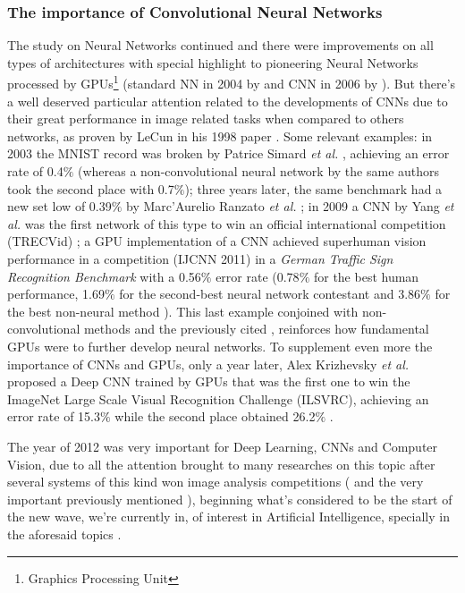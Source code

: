 \documentclass[class=report, crop=false, a4paper, 12pt]{standalone}
\begin{document}
\subsubsection{The importance of Convolutional Neural Networks}
The study on Neural Networks continued and there were improvements on all types of architectures \autocite{hochreiterLongShortTermMemory1997,wengCresceptronSelforganizingNeural1992} with special highlight to pioneering Neural Networks processed by GPUs\footnote{Graphics Processing Unit} (standard NN in 2004 by \autocite{ohGPUImplementationNeural2004} and CNN in 2006 by \autocite{chellapillaHighPerformanceConvolutional}). But there's a well deserved particular attention related to the developments of CNNs due to their great performance in image related tasks when compared to others networks, as proven by LeCun in his 1998 paper \autocite{lecunGradientBasedLearningApplied1998}. Some relevant examples: in 2003 the MNIST record was broken by Patrice Simard \textit{et al.} \autocite{simardBestPracticesConvolutional2003}, achieving an error rate of 0.4$\%$ (whereas a non-convolutional neural network by the same authors took the second place with 0.7$\%$); three years later, the same benchmark had a new set low of 0.39$\%$ by Marc’Aurelio Ranzato \textit{et al.} \autocite{ranzatoEfficientLearningSparse2006}; in 2009 a CNN by Yang \textit{et al.} was the first network of this type to win an official international competition (TRECVid) \autocite{Yang2009}; a GPU implementation of a CNN \autocite{ciresanCommitteeNeuralNetworks2011} achieved superhuman vision performance in a competition (IJCNN 2011) in a \textit{German Traffic Sign Recognition Benchmark} with a 0.56$\%$ error rate (0.78$\%$ for the best human performance, 1.69$\%$ for the second-best neural network contestant and 3.86$\%$ for the best non-neural method \autocite{stallkampManVsComputer2012}). This last example conjoined with non-convolutional methods \autocite{rainaLargescaleDeepUnsupervised2009b,ciresanDeepBigSimple2010} and the previously cited \autocite{chellapillaHighPerformanceConvolutional,ohGPUImplementationNeural2004}, reinforces how fundamental GPUs were to further develop neural networks. To supplement even more the importance of CNNs and GPUs, only a year later, Alex Krizhevsky \textit{et al.} proposed a Deep CNN trained by GPUs that was the first one to win the ImageNet Large Scale Visual Recognition Challenge (ILSVRC), achieving an error rate of 15.3$\%$ while the second place obtained 26.2$\%$ \autocite{krizhevskyImageNetClassificationDeep2012}. 
\par The year of 2012 was very important for Deep Learning, CNNs and Computer Vision, due to all the attention brought to many researches on this topic after several systems of this kind won image analysis competitions (\autocite{ciresanDeepNeuralNetworks2012,ciresanMitosisDetectionBreast2013} and the very important previously mentioned \autocite{krizhevskyImageNetClassificationDeep2012}), beginning what's considered to be the start of the new wave, we're currently in, of interest in Artificial Intelligence, specially in the aforesaid topics \autocite{liSurveyConvolutionalNeural2022}. 


\end{document}
